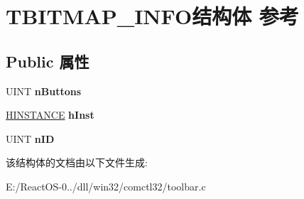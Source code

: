 \hypertarget{struct_t_b_i_t_m_a_p___i_n_f_o}{}\section{T\+B\+I\+T\+M\+A\+P\+\_\+\+I\+N\+F\+O结构体 参考}
\label{struct_t_b_i_t_m_a_p___i_n_f_o}
\subsection*{Public 属性}
\begin{DoxyCompactItemize}
\item 
\mbox{\label{struct_t_b_i_t_m_a_p___i_n_f_o_a9ad0fc1aa70a444d59edb4f1914d2cb5}} 
U\+I\+NT {\bfseries n\+Buttons}
\item 
\mbox{\label{struct_t_b_i_t_m_a_p___i_n_f_o_a4dda1b97349b76be7f3a679a58aa5ffb}} 
\hyperlink{interfacevoid}{H\+I\+N\+S\+T\+A\+N\+CE} {\bfseries h\+Inst}
\item 
\mbox{\label{struct_t_b_i_t_m_a_p___i_n_f_o_a1cb53ff9dbdd1f36e4fce9cd624ebbb2}} 
U\+I\+NT {\bfseries n\+ID}
\end{DoxyCompactItemize}


该结构体的文档由以下文件生成\+:\begin{DoxyCompactItemize}
\item 
E\+:/\+React\+O\+S-\/0../dll/win32/comctl32/toolbar.\+c\end{DoxyCompactItemize}
